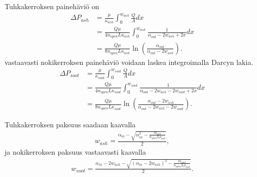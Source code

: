 Tuhkakerroksen painehäviö on
\begin{align}
    \Delta P_{ash} &= \frac{\mu}{\kappa_{ash}} \int_0^{w_{ash}}  \frac{Q}{A}dx 
    \nonumber\\ &= \frac{Q \mu }{4 n_{open} L \kappa_{ash}} \int_0^{w_{ash}}  \frac{1}{\alpha_{out}-2w_{ash}+2x}dx 
    \nonumber \\ &= \frac{Q\mu}{8 n_{open} L \kappa_{ash}}\ln\left(\frac{\alpha_{out}}{\alpha_{out}-2w_{ash}}\right).
\end{align}
vastaavasti nokikerroksen painehäviö voidaan laskea integroimalla Darcyn lakia. 
\begin{align}
    \Delta P_{soot }&= \frac{\mu}{\kappa_{soot}} \int_{0}^{w_{soot}}  \frac{Q}{A}dx 
    \nonumber\\    &= \frac{Q \mu }{4 n_{open} L \kappa_{soot}} \int_{0}^{w_{soot}}  \frac{1}{\alpha_{out}-2w_{ash}-2w_{soot}+2x}dx 
    \nonumber \\ &= \frac{Q\mu}{8 n_{open} L \kappa_{soot}}\ln\left(\frac{\alpha_{out}-2w_{ash}}{\alpha_{out}-2w_{ash}-2w_{soot}}\right).
\end{align}

Tuhkakerroksen paksuus saadaan kaavalla
\begin{align}
    w_{ash} = \frac{\alpha_{in} - \sqrt{\alpha_{in}^2 - \frac{m_{ash}}{ n_{open} L \rho_{ash}}}}{2},
\end{align}
ja nokikerroksen paksuus vastaavasti kaavalla
\begin{align}
    w_{soot}= \frac{\alpha_{in}-2w_{ash} - \sqrt{(\alpha_{in}-2w_{ash})^2 - \frac{m_{soot}}{ n_{open} L \rho_{soot}}}}{2}.
\end{align}